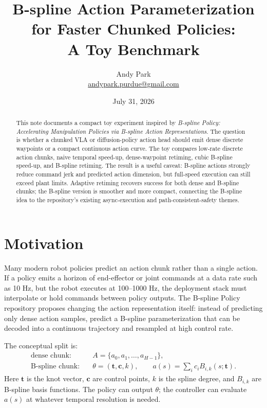 \documentclass[11pt]{article}
\title{B-spline Action Parameterization for Faster Chunked Policies:\\A Toy Benchmark}
\author{Andy Park\\\href{mailto:andypark.purdue@gmail.com}{andypark.purdue@gmail.com}}
\date{July 31, 2026}
\begin{document}
\maketitle

\begin{abstract}
This note documents a compact toy experiment inspired by \emph{B-spline Policy: Accelerating Manipulation Policies via B-spline Action Representations}. The question is whether a chunked VLA or diffusion-policy action head should emit dense discrete waypoints or a compact continuous action curve. The toy compares low-rate discrete action chunks, naive temporal speed-up, dense-waypoint retiming, cubic B-spline speed-up, and B-spline retiming. The result is a useful caveat: B-spline actions strongly reduce command jerk and predicted action dimension, but full-speed execution can still exceed plant limits. Adaptive retiming recovers success for both dense and B-spline chunks; the B-spline version is smoother and more compact, connecting the B-spline idea to the repository's existing async-execution and path-consistent-safety themes.
\end{abstract}

\section{Motivation}

Many modern robot policies predict an action chunk rather than a single action. If a policy emits a horizon of end-effector or joint commands at a data rate such as 10 Hz, but the robot executes at 100--1000 Hz, the deployment stack must interpolate or hold commands between policy outputs. The B-spline Policy repository proposes changing the action representation itself: instead of predicting only dense action samples, predict a B-spline parameterization that can be decoded into a continuous trajectory and resampled at high control rate.

The conceptual split is:
\begin{align*}
  \text{dense chunk:} \quad & A = \{a_0, a_1, \ldots, a_{H-1}\}, \\
  \text{B-spline chunk:} \quad & \theta = (\mathbf{t}, \mathbf{c}, k), \qquad a(s) = \sum_i c_i B_{i,k}(s; \mathbf{t}).
\end{align*}
Here \(\mathbf{t}\) is the knot vector, \(\mathbf{c}\) are control points, \(k\) is the spline degree, and \(B_{i,k}\) are B-spline basis functions. The policy can output \(\theta\); the controller can evaluate \(a(s)\) at whatever temporal resolution is needed.
\end{document}
